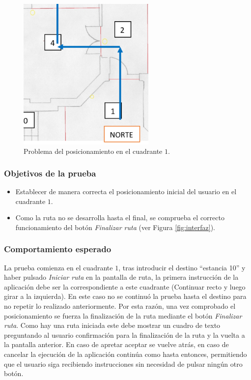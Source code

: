 \begin{figure}[t]
	\centering
	\includegraphics[width=0.6\textwidth]{Imagenes/Evaluacion/posic1}
	\caption{Problema del posicionamiento en el cuadrante $1$.}
	\label{fig:posic1}
\end{figure}

\subsubsection*{Objetivos de la prueba}

\begin{itemize}
	\item Establecer de manera correcta el posicionamiento inicial del usuario en el cuadrante $1$.
	
	\item Como la ruta no se desarrolla hasta el final, se comprueba el correcto funcionamiento del botón \textit{Finalizar ruta} (ver Figura \ref{fig:interfaz}).
\end{itemize}

\subsubsection*{Comportamiento esperado}

La prueba comienza en el cuadrante $1$, tras introducir el destino ``estancia 10'' y haber pulsado \textit{Iniciar ruta} en la pantalla de ruta, la primera instrucción de la aplicación debe ser la correspondiente a este cuadrante (Continuar recto y luego girar a la izquierda). En este caso no se continuó la prueba hasta el destino para no repetir lo realizado anteriormente. Por esta razón, una vez comprobado el posicionamiento se fuerza la finalización de la ruta mediante el botón \textit{Finalizar ruta}. Como hay una ruta iniciada este debe mostrar un cuadro de texto preguntando al usuario confirmación para la finalización de la ruta y la vuelta a la pantalla anterior. En caso de apretar aceptar se vuelve atrás, en caso de cancelar la ejecución de la aplicación continúa como hasta entonces, permitiendo que el usuario siga recibiendo instrucciones sin necesidad de pulsar ningún otro botón.



